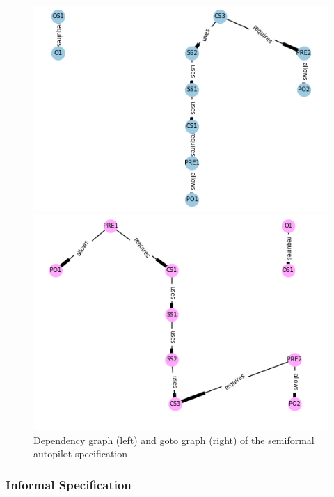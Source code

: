 \begin{figure}[H]
\centering
\begin{minipage}{0.45\textwidth}
\centering
\includegraphics[scale=0.4]{Figures/fullexample/sfdp.png}
\end{minipage}\hfill
\begin{minipage}{0.45\textwidth}
\centering
\includegraphics[scale=0.4]{Figures/fullexample/sfgoto.png}
\end{minipage}
\caption{Dependency graph (left) and goto graph (right) of the semiformal autopilot specification\label{fig:sfdepgoto}}
\end{figure}

\subsubsection{Informal Specification}

